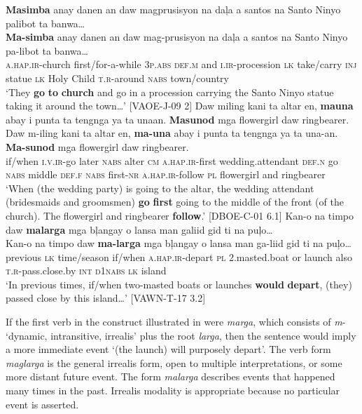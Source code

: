 \ea
\label{bkm:Ref119942002}
\textbf{Masimba}  anay  danen  an  daw  magprusisyon  na  daļa a  santos  na  Santo  Ninyo  palibot  ta  banwa… \\\smallskip
 \gll \textbf{Ma-simba}  anay  danen  an  daw  mag-prusisyon  na  daļa a  santos  na  Santo  Ninyo  pa-libot  ta  banwa… \\
 \textsc{a.hap.ir}-church  first/for-a-while  3\textsc{p.abs}  \textsc{def.m}  and  \textsc{i.ir}-procession  \textsc{lk} take/carry
\textsc{inj}   statue  \textsc{lk}  Holy  Child  \textsc{t.r}-around  \textsc{nabs}  town/country \\
\glt `They \textbf{go} \textbf{to} \textbf{church} and go in a procession carrying the Santo Ninyo statue taking it around the town…’ [VAOE-J-09 2]
\z
\ea
Daw  miling  kani  ta  altar  en,  \textbf{mauna}  abay  i punta  ta  tengnga  ya  ta  unaan.  \textbf{Masunod}  mga  flowergirl daw  ringbearer. \\\smallskip
 \gll Daw  m-iling  kani  ta  altar  en,  \textbf{ma-una}  abay  i punta  ta  tengnga  ya  ta  una-an.  \textbf{Ma-sunod}  mga  flowergirl daw  ringbearer. \\
 if/when  \textsc{i.v.ir}-go  later  \textsc{nabs}  alter  \textsc{cm}  \textsc{a.hap.ir}-first  wedding.attendant  \textsc{def.n}
go  \textsc{nabs}  middle  \textsc{def.f}  \textsc{nabs} first-\textsc{nr}  \textsc{a.hap.ir}-follow  \textsc{pl}   flowergirl and  ringbearer \\
\glt `When (the wedding party) is going to the altar, the wedding attendant (bridesmaids and groomsmen) \textbf{go} \textbf{first} going to the middle of the front (of the church). The flowergirl and ringbearer \textbf{follow}.’ [DBOE-C-01 6.1]
\z
\ea
\label{bkm:Ref89078422}
Kan-o  na  timpo  daw  \textbf{malarga}  mga  bļangay  o lansa  man  galiid  gid  ti  na  puļo… \\\smallskip
 \gll Kan-o  na  timpo  daw  \textbf{ma-larga}  mga  bļangay  o lansa  man  ga-liid  gid  ti  na  puļo… \\
 previous  \textsc{lk}  time/season  if/when  \textsc{a.hap.ir}-depart  \textsc{pl}  2.masted.boat  or
launch  also  \textsc{t.r}-pass.close.by  \textsc{int}  \textsc{d}1\textsc{nabs}  \textsc{lk}  island \\
\glt `In previous times, if/when two-masted boats or launches \textbf{would} \textbf{depart}, (they) passed close by this island…’ [VAWN-T-17 3.2]
\z

If the first verb in the construct illustrated in  were \textit{marga}, which consists of \textit{m}{}- ‘dynamic, intransitive, irrealis’ plus the root \textit{larga}, then the sentence would imply a more immediate event ‘(the launch) will purposely depart’. The verb form \textit{maglarga} is the general irrealis form, open to multiple interpretations, or some more distant future event. The form \textit{malarga} describes events that happened many times in the past. Irrealis modality is appropriate because no particular event is asserted.

